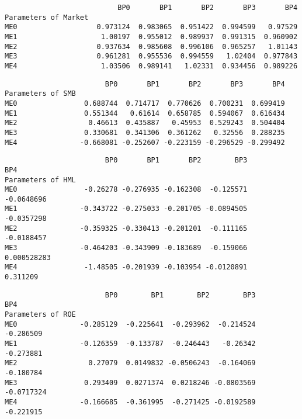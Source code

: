 \documentclass[11pt]{article}
\begin{document}
    
    \begin{verbatim}
                           BP0       BP1       BP2       BP3       BP4
Parameters of Market                                                  
ME0                   0.973124  0.983065  0.951422  0.994599   0.97529
ME1                    1.00197  0.955012  0.989937  0.991315  0.960902
ME2                   0.937634  0.985608  0.996106  0.965257   1.01143
ME3                   0.961281  0.955536  0.994559   1.02404  0.977843
ME4                    1.03506  0.989141   1.02331  0.934456  0.989226
    \end{verbatim}

    
    
    \begin{verbatim}
                        BP0       BP1       BP2       BP3       BP4
Parameters of SMB                                                  
ME0                0.688744  0.714717  0.770626  0.700231  0.699419
ME1                0.551344   0.61614  0.658785  0.594067  0.616434
ME2                 0.46613  0.435887   0.45953  0.529243  0.504404
ME3                0.330681  0.341306  0.361262   0.32556  0.288235
ME4               -0.668081 -0.252607 -0.223159 -0.296529 -0.299492
    \end{verbatim}

    
    
    \begin{verbatim}
                        BP0       BP1       BP2        BP3          BP4
Parameters of HML                                                      
ME0                -0.26278 -0.276935 -0.162308  -0.125571   -0.0648696
ME1               -0.343722 -0.275033 -0.201705 -0.0894505   -0.0357298
ME2               -0.359325 -0.330413 -0.201201  -0.111165   -0.0188457
ME3               -0.464203 -0.343909 -0.183689  -0.159066  0.000528283
ME4                -1.48505 -0.201939 -0.103954 -0.0120891     0.311209
    \end{verbatim}

    
    
    \begin{verbatim}
                        BP0        BP1        BP2        BP3        BP4
Parameters of ROE                                                      
ME0               -0.285129  -0.225641  -0.293962  -0.214524  -0.286509
ME1               -0.126359  -0.133787  -0.246443   -0.26342  -0.273881
ME2                 0.27079  0.0149832 -0.0506243  -0.164069  -0.180784
ME3                0.293409  0.0271374  0.0218246 -0.0803569 -0.0717324
ME4               -0.166685  -0.361995  -0.271425 -0.0192589  -0.221915
    \end{verbatim}
\end{document}
